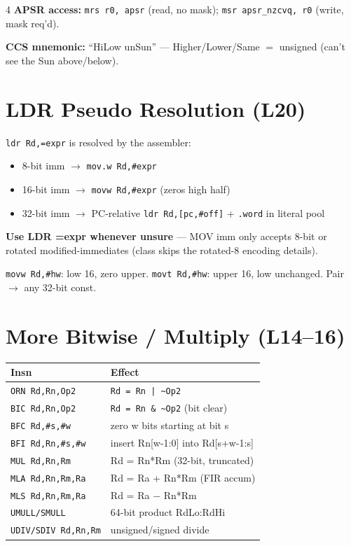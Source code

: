 \documentclass[8pt,landscape]{extarticle}
\newcommand{\asm}[1]{\texttt{\scriptsize #1}}
\newcommand{\cee}[1]{\texttt{\scriptsize #1}}
\begin{document}
\begin{multicols*}{4}
\textbf{APSR access:} \asm{mrs r0, apsr} (read, no mask); \asm{msr apsr\_nzcvq, r0} (write, mask req'd).

\textbf{CCS mnemonic:} ``HiLow unSun'' --- Higher/Lower/Same $=$ unsigned (can't see the Sun above/below).

\section{LDR Pseudo Resolution (L20)}
\asm{ldr Rd,=expr} is resolved by the assembler:
\begin{itemize}
\item 8-bit imm $\to$ \asm{mov.w Rd,\#expr}
\item 16-bit imm $\to$ \asm{movw Rd,\#expr} (zeros high half)
\item 32-bit imm $\to$ PC-relative \asm{ldr Rd,[pc,\#off]} + \texttt{.word} in literal pool
\end{itemize}
\textbf{Use LDR =expr whenever unsure} --- MOV imm only accepts 8-bit or rotated modified-immediates (class skips the rotated-8 encoding details).

\asm{movw Rd,\#hw}: low 16, zero upper. \asm{movt Rd,\#hw}: upper 16, low unchanged. Pair $\to$ any 32-bit const.

\section{More Bitwise / Multiply (L14--16)}

\begin{tabular}{@{}ll@{}}
\toprule
Insn & Effect \\
\midrule
\asm{ORN Rd,Rn,Op2}   & \cee{Rd = Rn | \textasciitilde Op2} \\
\asm{BIC Rd,Rn,Op2}   & \cee{Rd = Rn \& \textasciitilde Op2} (bit clear) \\
\asm{BFC Rd,\#s,\#w}  & zero w bits starting at bit s \\
\asm{BFI Rd,Rn,\#s,\#w} & insert Rn[w-1:0] into Rd[s+w-1:s] \\
\asm{MUL Rd,Rn,Rm}    & Rd = Rn*Rm (32-bit, truncated) \\
\asm{MLA Rd,Rn,Rm,Ra} & Rd = Ra + Rn*Rm (FIR accum) \\
\asm{MLS Rd,Rn,Rm,Ra} & Rd = Ra $-$ Rn*Rm \\
\asm{UMULL/SMULL}     & 64-bit product RdLo:RdHi \\
\asm{UDIV/SDIV Rd,Rn,Rm} & unsigned/signed divide \\
\bottomrule
\end{tabular}


\end{multicols*}
\end{document}
